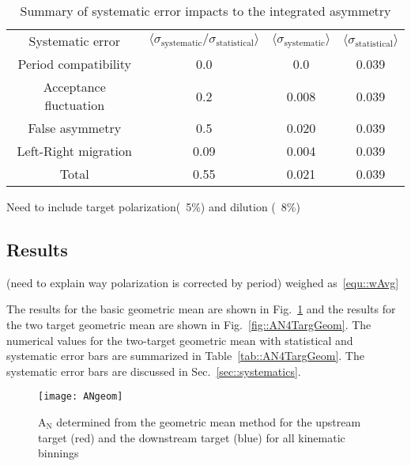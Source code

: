 \begin{table}[h!t]
  \centering
  \begin{tabular}{|c|c|c|c|}
    \hline
    \multirow{2}{*}{Systematic error}&
    \multirow{2}{*}{
      $\langle \sigma_{\mathrm{systematic}}/\sigma_{\mathrm{statistical}}
      \rangle$} &
    \multirow{2}{*}{$\langle \sigma_{\mathrm{systematic}} \rangle$} &
    \multirow{2}{*}{$\langle \sigma_{\mathrm{statistical}} \rangle$} \\
    
    & & & \\ \hline

    Period compatibility& 0.0 & 0.0 & 0.039\\ \hline

    Acceptance fluctuation& 0.2 & 0.008 & 0.039\\ \hline

    False asymmetry& 0.5 & 0.020 & 0.039\\ \hline

    Left-Right migration& 0.09 & 0.004 & 0.039\\ \hline

    Total& 0.55 & 0.021 & 0.039\\\hline
    
  \end{tabular}
  \caption{Summary of systematic error impacts to the integrated asymmetry}
  \label{tab::sysError}
\end{table}
Need to include target polarization(~5\%) and dilution (~8\%)

\subsection{Results} \label{sec::lr_results}
(need to explain way polarization is corrected by period)
weighed as~\ref{equ::wAvg}

\noindent
The results for the basic geometric mean are shown in Fig.~\ref{fig::ANgeom} and
the results for the two target geometric mean are shown in
Fig.~\ref{fig::AN4TargGeom}.  The numerical values for the two-target geometric
mean with statistical and systematic error bars are summarized in
Table~\ref{tab::AN4TargGeom}.  The systematic error bars are discussed in
Sec.~\ref{sec::systematics}.

\begin{figure}[h!t]
  \begin{center}
    \texttt{[image: ANgeom]} 
    \caption{A$_{\mathrm{N}}$ determined from the geometric mean method for the
      upstream target (red) and the downstream target (blue) for all kinematic
      binnings}
    \label{fig::ANgeom}
  \end{center}
\end{figure}

